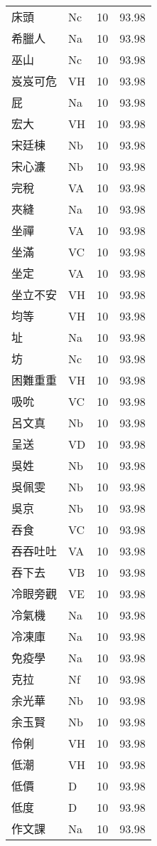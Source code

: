 \documentclass[twocolumn]{book}
\begin{document}
\begin{supertabular}{llrr}
床頭 & Nc & 10 &  93.98\\
希臘人 & Na & 10 &  93.98\\
巫山 & Nc & 10 &  93.98\\
岌岌可危 & VH & 10 &  93.98\\
屁 & Na & 10 &  93.98\\
宏大 & VH & 10 &  93.98\\
宋廷棟 & Nb & 10 &  93.98\\
宋心濂 & Nb & 10 &  93.98\\
完稅 & VA & 10 &  93.98\\
夾縫 & Na & 10 &  93.98\\
坐禪 & VA & 10 &  93.98\\
坐滿 & VC & 10 &  93.98\\
坐定 & VA & 10 &  93.98\\
坐立不安 & VH & 10 &  93.98\\
均等 & VH & 10 &  93.98\\
址 & Na & 10 &  93.98\\
坊 & Nc & 10 &  93.98\\
困難重重 & VH & 10 &  93.98\\
吸吮 & VC & 10 &  93.98\\
呂文真 & Nb & 10 &  93.98\\
呈送 & VD & 10 &  93.98\\
吳姓 & Nb & 10 &  93.98\\
吳佩雯 & Nb & 10 &  93.98\\
吳京 & Nb & 10 &  93.98\\
吞食 & VC & 10 &  93.98\\
吞吞吐吐 & VA & 10 &  93.98\\
吞下去 & VB & 10 &  93.98\\
冷眼旁觀 & VE & 10 &  93.98\\
冷氣機 & Na & 10 &  93.98\\
冷凍庫 & Na & 10 &  93.98\\
免疫學 & Na & 10 &  93.98\\
克拉 & Nf & 10 &  93.98\\
余光華 & Nb & 10 &  93.98\\
余玉賢 & Nb & 10 &  93.98\\
伶俐 & VH & 10 &  93.98\\
低潮 & VH & 10 &  93.98\\
低價 & D & 10 &  93.98\\
低度 & D & 10 &  93.98\\
作文課 & Na & 10 &  93.98\\

\end{supertabular}
\end{document}
